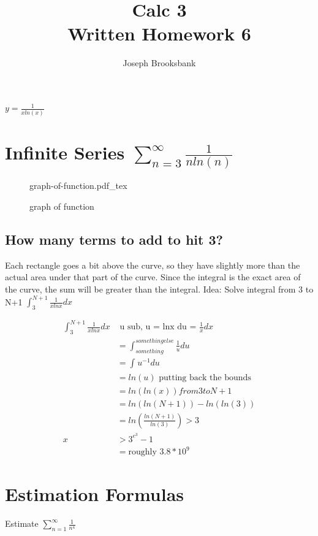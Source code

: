 \documentclass[12pt]{article}
\title{Calc 3 \\ Written Homework 6}
\author{Joseph Brooksbank}
\newcommand{\incfig}[1]{%
    \def\svgwidth{\columnwidth}
    {#1.pdf_tex}
}
\begin{document}
\maketitle

\newcommand\graph1{$y = \frac{1}{x ln(x)}$
\section{Infinite Series $\sum_{n=3}^{\infty} \frac{1}{n ln(n)} $ }
\begin{figure}[ht]
    \centering
    \incfig{graph-of-function}
    \caption{graph of function}
    \label{fig:graph-of-function}
\end{figure}

\subsection*{ How many terms to add to hit 3?}

Each rectangle goes a bit above the curve, so they have slightly more than the actual area under that part of the curve. Since the integral is the exact area of the curve, the sum will be greater than the integral. 
Idea: Solve integral from 3 to N+1 $\int_{3}^{N+1} \frac{1}{xlnx} dx $

\begin{align*}
        \int_{3}^{N+1} \frac{1}{xlnx} dx& \text{ u sub, u = lnx du = $\frac{1}{x}dx$} \\
                                        &= \int_{something}^{something else} \frac{1}{u} du  
                                        \\
                                        &= \int_{}^{} u^{-1} du 
                                        \\
                                        &= ln(u) \text{ putting back the bounds} \\
                                        &= ln(ln(x)) from 3 to N+1 \\
                                        &= ln(ln(N+1)) - ln(ln(3))
                                        \\
                                        &= ln(\frac{ln(N+1)}{ln(3)}) > 3\\
        x &> 3^{e^{3}}-1
        \\
          &= \text{roughly $3.8 * 10^{9}$} 
\end{align*}

\section{Estimation Formulas}
Estimate $\sum_{n=1}^{\infty} \frac{1}{n^{4}}$ 

}
\end{document}
